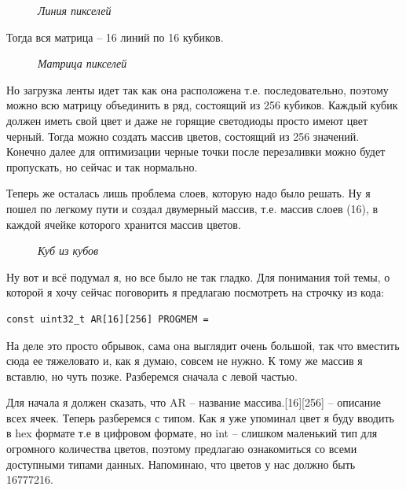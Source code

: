 \documentclass[a4paper, 12pt]{article}
\newcommand{\image}[3]{
	\begin{figure}[ht]
		\center{\texttt{[image: img/\#1]} }
		\caption{\textit{#3}}\end{figure}
}
\begin{document}
\image{Линия.png}{150}{Линия пикселей}

Тогда вся матрица -- 16 линий по 16 кубиков.

\image{Матрица.png}{130}{Матрица пикселей}

Но загрузка ленты идет так как она расположена т.е. последовательно, поэтому
можно всю матрицу объединить в ряд, состоящий из 256 кубиков. Каждый кубик
должен иметь свой цвет и даже не горящие светодиоды просто имеют цвет черный.
Тогда можно создать массив цветов, состоящий из 256 значений.
Конечно далее для оптимизации черные точки после перезаливки можно будет
пропускать, но сейчас и так нормально.

Теперь же осталась лишь проблема слоев, которую надо было решать. Ну я пошел
по легкому пути и создал двумерный массив, т.е. массив слоев (16), в каждой
ячейке которого хранится массив цветов.

\image{Куб в кубе.png}{200}{Куб из кубов}

Ну вот и всё подумал я, но все было не так гладко. Для понимания той темы, о
которой я хочу сейчас поговорить я предлагаю посмотреть на строчку из кода:
\begin{lstlisting}[style=myLatexStyle]
const uint32_t AR[16][256] PROGMEM = 
\end{lstlisting}

На деле это просто обрывок, сама она выглядит очень большой, так что вместить
сюда ее тяжеловато и, как я думаю, совсем не нужно. К тому же массив я вставлю,
но чуть позже. Разберемся сначала с левой частью.

Для начала я должен сказать, что AR -- название массива.[16][256] -- описание
всех ячеек. Теперь разберемся с типом. Как я уже упоминал цвет я буду вводить
в hex формате т.е в цифровом формате, но int -- слишком маленький тип для
огромного количества цветов, поэтому предлагаю ознакомиться со всеми доступными
типами данных. Напоминаю, что цветов у нас должно быть 16777216.
\end{document}
